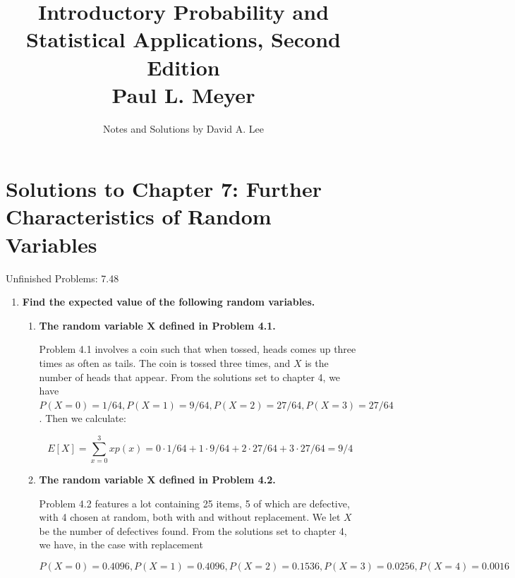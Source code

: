 \documentclass[10pt, oneside]{article}
\title{Introductory Probability and Statistical Applications, Second Edition \\
\large{Paul L. Meyer}}
\author{Notes and Solutions by David A. Lee}
\date{}							%
\begin{document}
\maketitle
\section*{Solutions to Chapter 7: Further Characteristics of Random Variables}

Unfinished Problems: 7.48

\begin{enumerate}[label=7.\arabic*]
\itemsep0em 
\item  \begin{tcolorbox}[
  colback=Cerulean!5!white,
  colframe=Cerulean!75!black]
\textbf{Find the expected value of the following random variables.}
\end{tcolorbox}

	\begin{enumerate}
	\item  \begin{tcolorbox}[
	  colback=Cerulean!5!white,
	  colframe=Cerulean!75!black]
	\textbf{The random variable $\bm{X}$ defined in Problem 4.1.}
	\end{tcolorbox}
	
	Problem 4.1 involves a coin such that when tossed, heads comes up three times as often as tails. The coin is tossed three times, and $X$ is the number of heads that appear. From the solutions set to chapter 4, we have $P(X = 0) = 1/64, P(X = 1) = 9/64, P(X = 2) = 27/64, P(X = 3) = 27/64$. Then we calculate:
	
	\[ E[X] = \sum^3_{x=0} xp(x) = 0 \cdot 1/64 + 1 \cdot 9/64 + 2 \cdot 27/64 + 3 \cdot 27/64 = \boxed{9/4} \]
	
	\item  \begin{tcolorbox}[
	  colback=Cerulean!5!white,
	  colframe=Cerulean!75!black]
	\textbf{The random variable $\bm{X}$ defined in Problem 4.2.}
	\end{tcolorbox}
	
	Problem 4.2 features a lot containing 25 items, 5 of which are defective, with 4 chosen at random, both with and without replacement. We let $X$ be the number of defectives found. From the solutions set to chapter 4, we have, in the case with replacement
	
	 \[ P(X=0) = 0.4096, P(X = 1) = 0.4096, P(X = 2) = 0.1536, P(X = 3) = 0.0256, P(X = 4) = 0.0016 \]
	 

\end{enumerate}
\end{enumerate}
\end{document}
